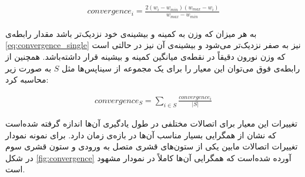 \documentclass[12pt]{report}
\begin{document}
	\begin{align}
		convergence_i = \frac{2 (w_i - w_{min})(w_{max} - w_i) }{ w_{max} - w_{min} }
		\label{eq:convergence_single}
	\end{align}

	به هر میزان که وزن به کمینه و بیشینه‌ی خود نزدیک‌تر باشد مقدار رابطه‌ی \ref{eq:convergence_single} نیز به صفر نزدیک‌تر می‌شود و بیشینه‌ی آن نیز در حالتی است که وزن نورون دقیقاً در نقطه‌ی میانگین کمینه و بیشینه قرار داشته‌باشد. همچنین از رابطه‌ی فوق می‌توان این معیار را برای یک مجموعه از سیناپس‌ها مثل $S$ به صورت زیر محاسبه کرد:
	
	\begin{align}
		convergence_{S} = \sum_{i \in S} \frac{convergence_i}{|S|} 
		\label{eq:convergence_pop}
	\end{align}
	
	تغییرات این معیار برای اتصالات مختلفی در طول یادگیری آن‌ها اندازه گرفته‌ شده‌است که نشان از همگرایی بسیار مناسب آن‌ها در بازه‌ی زمان دارد. برای نمونه نمودار تغییرات اتصالات مابین یکی از ستون‌های قشری متصل به ورودی و ستون قشری سوم در شکل \ref{fig:convergence} آورده شده‌است که همگرایی آن‌ها کاملاً در نمودار مشهود است.
	
\end{document}
